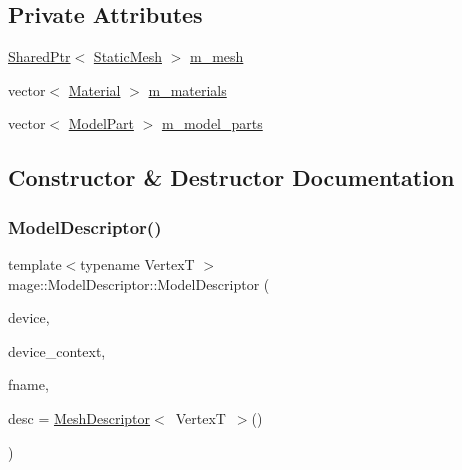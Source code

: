 \subsection*{Private Attributes}
\begin{DoxyCompactItemize}
\item 
\hyperlink{namespacemage_a1e01ae66713838a7a67d30e44c67703e}{Shared\+Ptr}$<$ \hyperlink{classmage_1_1_static_mesh}{Static\+Mesh} $>$ \hyperlink{classmage_1_1_model_descriptor_ac3935d5b0738860809a770403ed07480}{m\+\_\+mesh}
\item 
vector$<$ \hyperlink{structmage_1_1_material}{Material} $>$ \hyperlink{classmage_1_1_model_descriptor_a672238b257f99836243d84f634ffeea2}{m\+\_\+materials}
\item 
vector$<$ \hyperlink{structmage_1_1_model_part}{Model\+Part} $>$ \hyperlink{classmage_1_1_model_descriptor_a200c6e44c9b6a5bde5c8490fb93ba00f}{m\+\_\+model\+\_\+parts}
\end{DoxyCompactItemize}


\subsection{Constructor \& Destructor Documentation}
\hypertarget{classmage_1_1_model_descriptor_a1ae1d85907be96350cef77e6a4ba4fb9}{}\label{classmage_1_1_model_descriptor_a1ae1d85907be96350cef77e6a4ba4fb9} 
\subsubsection{\texorpdfstring{Model\+Descriptor()}{ModelDescriptor()}\hspace{0.1cm}{\footnotesize\ttfamily [1/3]}}
{\footnotesize\ttfamily template$<$typename VertexT $>$ \\
mage\+::\+Model\+Descriptor\+::\+Model\+Descriptor (\begin{DoxyParamCaption}\item[{I\+D3\+D11\+Device2 $\ast$}]{device,  }\item[{I\+D3\+D11\+Device\+Context2 $\ast$}]{device\+\_\+context,  }\item[{const wstring \&}]{fname,  }\item[{const \hyperlink{structmage_1_1_mesh_descriptor}{Mesh\+Descriptor}$<$ VertexT $>$ \&}]{desc = {\ttfamily \hyperlink{structmage_1_1_mesh_descriptor}{Mesh\+Descriptor}$<$~VertexT~$>$()} }\end{DoxyParamCaption})\hspace{0.3cm}{\ttfamily [explicit]}}

